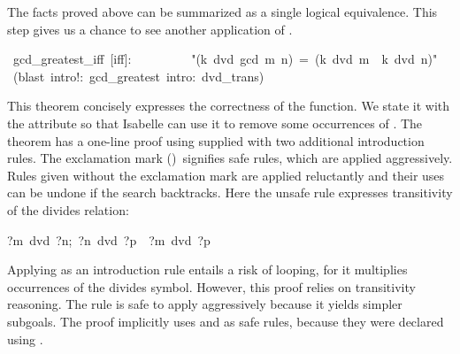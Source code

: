 \medskip
The facts proved above can be summarized as a single logical 
equivalence.  This step gives us a chance to see another application
of .
\begin{isabelle}
\ gcd\_greatest\_iff\ [iff]:\ \isanewline
\ \ \ \ \ \ \ \ "(k\ dvd\ gcd\ m\ n)\ =\ (k\ dvd\ m\ \isasymand \ k\ dvd\ n)"\isanewline
{}\ (blast\ intro!:\ gcd_greatest\ intro:\ dvd_trans)
\end{isabelle}
This theorem concisely expresses the correctness of the  
function. 
We state it with the  attribute so that 
Isabelle can use it to remove some occurrences of . 
The theorem has a one-line 
proof using  supplied with two additional introduction 
rules. The exclamation mark 
({}{\isa{!}})\ signifies safe rules, which are 
applied aggressively.  Rules given without the exclamation mark 
are applied reluctantly and their uses can be undone if 
the search backtracks.  Here the unsafe rule expresses transitivity  
of the divides relation:
\begin{isabelle}
\isasymlbrakk?m\ dvd\ ?n;\ ?n\ dvd\ ?p\isasymrbrakk\ \isasymLongrightarrow\ ?m\ dvd\ ?p%
\end{isabelle}
Applying  as 
an introduction rule entails a risk of looping, for it multiplies 
occurrences of the divides symbol. However, this proof relies 
on transitivity reasoning.  The rule {} is safe to apply 
aggressively because it yields simpler subgoals.  The proof implicitly
uses  and  as safe rules, because they were
declared using .%
